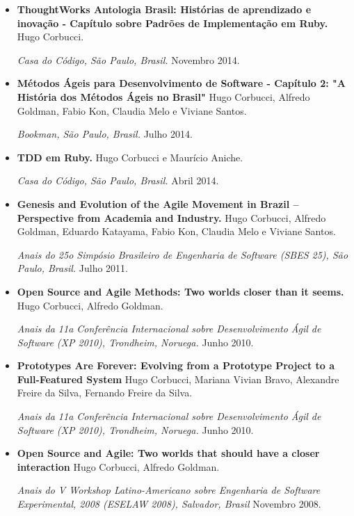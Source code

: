 \documentclass[letter,10pt]{article}
\begin{document}
\begin{itemize}
\item \textbf{ThoughtWorks Antologia Brasil: Histórias de
    aprendizado e inovação - Capítulo sobre Padrões de Implementação em Ruby.} Hugo Corbucci.

  \textit{Casa do Código, São Paulo, Brasil.} Novembro 2014.

\item \textbf{Métodos Ágeis para Desenvolvimento de Software - Capítulo 2: "A História dos Métodos Ágeis no Brasil"} Hugo Corbucci,
        Alfredo Goldman, Fabio Kon, Claudia Melo e Viviane Santos.

  \textit{Bookman, São Paulo, Brasil.} Julho 2014.

\item \textbf{TDD em Ruby.} Hugo Corbucci e Maurício Aniche.

  \textit{Casa do Código, São Paulo, Brasil.} Abril 2014.

\item \textbf{Genesis and Evolution of the Agile Movement in Brazil
        – Perspective from Academia and Industry.} Hugo Corbucci,
        Alfredo Goldman, Eduardo Katayama, Fabio Kon, Claudia Melo
        e Viviane Santos.

  \textit{Anais do 25o Simpósio Brasileiro de Engenharia de Software
     (SBES 25), São Paulo, Brasil.} Julho 2011.

\item \textbf{Open Source and Agile Methods: Two worlds closer than it
    seems.} Hugo Corbucci, Alfredo Goldman.

  \textit{Anais da 11a Conferência Internacional sobre Desenvolvimento
    Ágil de Software (XP 2010), Trondheim, Noruega.} Junho 2010.

\item \textbf{Prototypes Are Forever: Evolving from a Prototype
    Project to a Full-Featured System} Hugo Corbucci, Mariana Vivian
  Bravo, Alexandre Freire da Silva, Fernando Freire da Silva.

  \textit{Anais da 11a Conferência Internacional sobre Desenvolvimento
    Ágil de Software (XP 2010), Trondheim, Noruega.} Junho 2010.

\item \textbf{Open Source and Agile: Two worlds that should have a
    closer interaction} Hugo Corbucci, Alfredo Goldman.

  \textit{Anais do V Workshop Latino-Americano sobre Engenharia de
    Software Experimental, 2008 (ESELAW 2008), Salvador, Brasil}
  Novembro 2008.


\end{itemize}
\end{document}
